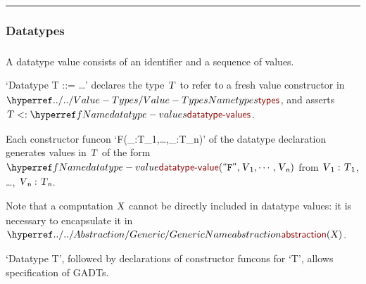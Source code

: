 

\begin{center}
\rule{3in}{0.4pt}
\end{center}

\subsubsection{Datatypes}\hypertarget{datatypes}{}\label{datatypes}

\begin{align*}
  [ \
  \KEY{Type} \quad & \NAMEREF{datatype-values} \\
  \KEY{Funcon} \quad & \NAMEREF{datatype-value} \\
  \KEY{Funcon} \quad & \NAMEREF{datatype-value-id} \\
  \KEY{Funcon} \quad & \NAMEREF{datatype-value-elements}
  \ ]
\end{align*}
A datatype value consists of an identifier and a sequence of values.

`Datatype T ::= \ldots{}' declares the type $\SHADE{\VAR{T}}$ to refer to a fresh value
  constructor in $\SHADE{\NAMEHYPER{../..}{Value-Types}{types}}$, and asserts $\SHADE{\VAR{T} <: \NAMEREF{datatype-values}}$.

Each constructor funcon `F(\_:T\_1,\ldots{},\_:T\_n)' of the datatype declaration
  generates values in $\SHADE{\VAR{T}}$ of the form $\SHADE{\NAMEREF{datatype-value}
           (  \STRING{F}, 
                  \VAR{V}\SUB{1}, 
                  \cdots, 
                  \VAR{V}\SUB{n} )}$ from
  $\SHADE{\VAR{V}\SUB{1} : \VAR{T}\SUB{1}}$, \ldots{}, $\SHADE{\VAR{V}\SUB{n} : \VAR{T}\SUB{n}}$.

Note that a computation $\SHADE{\VAR{X}}$ cannot be directly included in datatype values:
  it is necessary to encapsulate it in $\SHADE{\NAMEHYPER{../../Abstraction}{Generic}{abstraction}
           (  \VAR{X} )}$.

`Datatype T', followed by declarations of constructor funcons for `T',
  allows specification of GADTs.

